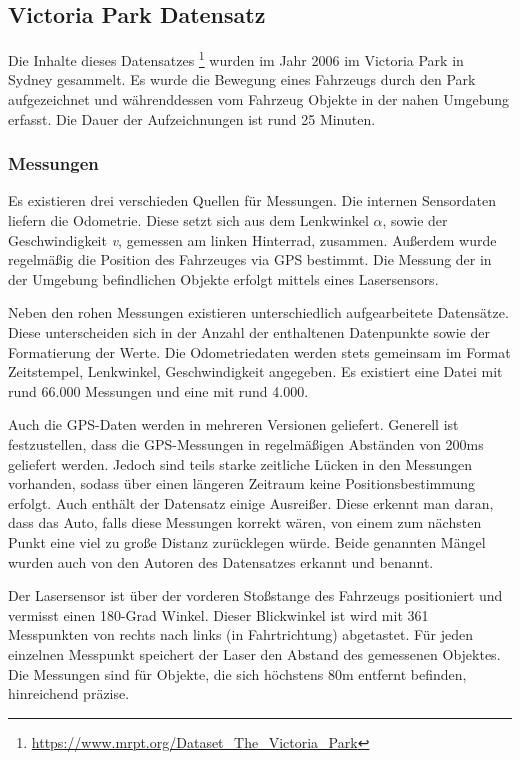 \documentclass[11pt]{article}
\begin{document}
\subsection{Victoria Park Datensatz}
Die Inhalte dieses Datensatzes \footnote{\url{https://www.mrpt.org/Dataset_The_Victoria_Park}} wurden im Jahr 2006 im Victoria Park in Sydney gesammelt. Es wurde die Bewegung eines Fahrzeugs durch den Park aufgezeichnet und währenddessen vom Fahrzeug Objekte in der nahen Umgebung erfasst. Die Dauer der Aufzeichnungen ist rund 25 Minuten.

\subsubsection{Messungen}
Es existieren drei verschieden Quellen für Messungen. Die internen Sensordaten liefern die Odometrie. Diese setzt sich aus dem Lenkwinkel \(\alpha\), sowie der Geschwindigkeit \textit{v}, gemessen am linken Hinterrad, zusammen. Außerdem wurde regelmäßig die Position des Fahrzeuges via GPS bestimmt. Die Messung der in der Umgebung befindlichen Objekte erfolgt mittels eines Lasersensors.

Neben den rohen Messungen existieren unterschiedlich aufgearbeitete Datensätze. Diese unterscheiden sich in der Anzahl der enthaltenen Datenpunkte sowie der Formatierung der Werte. Die Odometriedaten werden stets gemeinsam im Format {Zeitstempel, Lenkwinkel, Geschwindigkeit} angegeben. Es existiert eine Datei mit rund 66.000 Messungen und eine mit rund 4.000.

Auch die GPS-Daten werden in mehreren Versionen geliefert. Generell ist festzustellen, dass die GPS-Messungen in regelmäßigen Abständen von 200ms geliefert werden. Jedoch sind teils starke zeitliche Lücken in den Messungen vorhanden, sodass über einen längeren Zeitraum keine Positionsbestimmung erfolgt. Auch enthält der Datensatz einige Ausreißer. Diese erkennt man daran, dass das Auto, falls diese Messungen korrekt wären, von einem zum nächsten Punkt eine viel zu große Distanz zurücklegen würde. Beide genannten Mängel wurden auch von den Autoren des Datensatzes erkannt und benannt.

Der Lasersensor ist über der vorderen Stoßstange des Fahrzeugs positioniert und vermisst einen 180-Grad Winkel. Dieser Blickwinkel ist wird mit 361 Messpunkten von rechts nach links (in Fahrtrichtung) abgetastet. Für jeden einzelnen Messpunkt speichert der Laser den Abstand des gemessenen Objektes. Die Messungen sind für Objekte, die sich höchstens 80m entfernt befinden, hinreichend präzise. 
\end{document}
